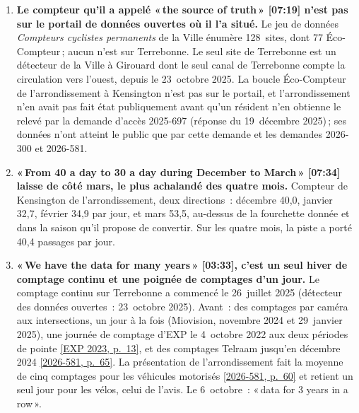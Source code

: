 \documentclass[10pt,letterpaper]{article}
\newcommand{\repourl}{https://github.com/OpenMobilityData/Terrebonne-open-sources}
\newcommand{\pagesurl}{https://openmobilitydata.github.io/Terrebonne-access-requests}
\newcommand{\cliptime}[1]{\textsf{\small[#1]}}
\newcommand{\pgl}[2]{\href{\pagesurl/2026-581/raw/01_emails_mandate_counts.pdf\#page=#1}{\textsf{\small[2026-581, p.~#2]}}}
\newcommand{\pg}[1]{\pgl{#1}{#1}}
\newcommand{\exppg}[1]{\href{\repourl/blob/main/2023-exp-mobility-study/raw/EXP_Etude_de_mobilite_rue_de_Terrebonne_2023.pdf}{\textsf{\small[EXP 2023, p.~#1]}}}
\begin{document}
\begin{enumerate}[nosep,itemsep=0.3em,leftmargin=1.4em]
  \item \begin{minipage}[t]{\linewidth}\textbf{Le compteur qu'il a appelé «\,the source of truth\,» \cliptime{07:19} n'est pas sur le portail de données ouvertes où il l'a situé.} Le jeu de données \emph{Compteurs cyclistes permanents} de la Ville énumère 128~sites, dont 77 Éco-Compteur\,; aucun n'est sur Terrebonne. Le seul site de Terrebonne est un détecteur de la Ville à Girouard dont le seul canal de Terrebonne compte la circulation vers l'ouest, depuis le 23~octobre 2025. La boucle Éco-Compteur de l'arrondissement à Kensington n'est pas sur le portail, et l'arrondissement n'en avait pas fait état publiquement avant qu'un résident n'en obtienne le relevé par la demande d'accès 2025-697 (réponse du 19~décembre 2025)\,; ses données n'ont atteint le public que par cette demande et les demandes 2026-300 et 2026-581.\end{minipage}\vspace{0.35em}
  \item \begin{minipage}[t]{\linewidth}\textbf{«\,From 40 a day to 30 a day during December to March\,» \cliptime{07:34} laisse de côté mars, le plus achalandé des quatre mois.} Compteur de Kensington de l'arrondissement, deux directions~: décembre 40{,}0, janvier 32{,}7, février 34{,}9 par jour, et mars 53{,}5, au-dessus de la fourchette donnée et dans la saison qu'il propose de convertir. Sur les quatre mois, la piste a porté 40{,}4 passages par jour.\end{minipage}\vspace{0.35em}
  \item \begin{minipage}[t]{\linewidth}\textbf{«\,We have the data for many years\,» \cliptime{03:33}, c'est un seul hiver de comptage continu et une poignée de comptages d'un jour.} Le comptage continu sur Terrebonne a commencé le 26~juillet 2025 (détecteur des données ouvertes~: 23~octobre 2025). Avant~: des comptages par caméra aux intersections, un jour à la fois (Miovision, novembre 2024 et 29~janvier 2025), une journée de comptage d'EXP le 4~octobre 2022 aux deux périodes de pointe \exppg{13}, et des comptages Telraam jusqu'en décembre 2024 \pg{65}. La présentation de l'arrondissement fait la moyenne de cinq comptages pour les véhicules motorisés \pg{60} et retient un seul jour pour les vélos, celui de l'avis. Le 6~octobre~: «\,data for 3 years in a row\,».\end{minipage}\vspace{0.35em}

\end{enumerate}
\end{document}
